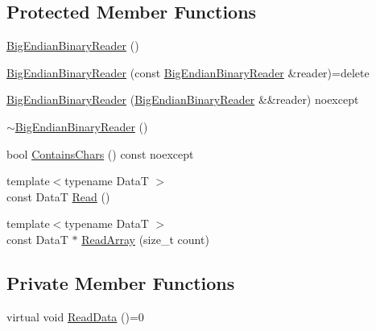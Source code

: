 \subsection*{Protected Member Functions}
\begin{DoxyCompactItemize}
\item 
\hyperlink{classmage_1_1_big_endian_binary_reader_a1fd0dbee6950a8cb04aa399f0cdbaf2a}{Big\+Endian\+Binary\+Reader} ()
\item 
\hyperlink{classmage_1_1_big_endian_binary_reader_a9d490263268290217ae4f2f06e0699c4}{Big\+Endian\+Binary\+Reader} (const \hyperlink{classmage_1_1_big_endian_binary_reader}{Big\+Endian\+Binary\+Reader} \&reader)=delete
\item 
\hyperlink{classmage_1_1_big_endian_binary_reader_a16c4303dfb333ebdddfc07c924b9735a}{Big\+Endian\+Binary\+Reader} (\hyperlink{classmage_1_1_big_endian_binary_reader}{Big\+Endian\+Binary\+Reader} \&\&reader) noexcept
\item 
\hyperlink{classmage_1_1_big_endian_binary_reader_ae85a40e8ed06e8c887e38d914843b8d3}{$\sim$\+Big\+Endian\+Binary\+Reader} ()
\item 
bool \hyperlink{classmage_1_1_big_endian_binary_reader_ac6de015b6bbcecdcef58ab074d99fb49}{Contains\+Chars} () const noexcept
\item 
{\footnotesize template$<$typename DataT $>$ }\\const DataT \hyperlink{classmage_1_1_big_endian_binary_reader_a5353ce3b1eaedd51ccb4d2d951bf499b}{Read} ()
\item 
{\footnotesize template$<$typename DataT $>$ }\\const DataT $\ast$ \hyperlink{classmage_1_1_big_endian_binary_reader_a534f06cc9b44757271595c614e8793d2}{Read\+Array} (size\+\_\+t count)
\end{DoxyCompactItemize}
\subsection*{Private Member Functions}
\begin{DoxyCompactItemize}
\item 
virtual void \hyperlink{classmage_1_1_big_endian_binary_reader_a7dc0689d598fa91308597b129516a11d}{Read\+Data} ()=0
\end{DoxyCompactItemize}
